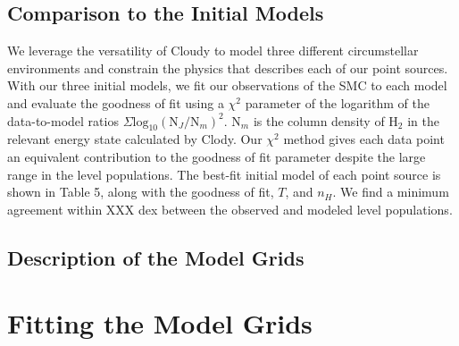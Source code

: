\documentclass[12pt, letterpaper]{book}
\begin{document}
\subsection{Comparison to the Initial Models}
We leverage the versatility of Cloudy to model three different circumstellar environments and constrain the physics that describes each of our point sources. With our three initial models, we fit our observations of the SMC to each model and evaluate the goodness of fit using a $\chi^2$ parameter of the logarithm of the data-to-model ratios $\Sigma \textrm{log}_{10} ( \textrm{N}_{J} / \textrm{N}_{m} )^2$. $\textrm{N}_{m}$ is the column density of $\textrm{H}_2$ in the relevant energy state calculated by Clody. Our $\chi^2$ method gives each data point an equivalent contribution to the goodness of fit parameter despite the large range in the level populations. The best-fit initial model of each point source is shown in Table 5, along with the goodness of fit, $T$, and $n_H$. We find a minimum agreement within XXX dex between the observed and modeled level populations.

\subsection{Description of the Model Grids}

\section{Fitting the Model Grids}
\label{sec:models_C}
\end{document}
